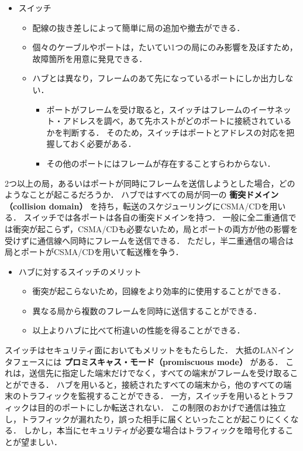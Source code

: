 \documentclass[a4paper]{ltjsarticle}
\providecommand{\tightlist}{%
  \setlength{\itemsep}{0pt}\setlength{\parskip}{0pt}}
\begin{document}
\begin{itemize}
\tightlist
\item
  スイッチ

  \begin{itemize}
  \tightlist
  \item
    配線の抜き差しによって簡単に局の追加や撤去ができる．
  \item
    個々のケーブルやポートは，たいてい1つの局にのみ影響を及ぼすため，故障箇所を用意に発見できる．
  \item
    ハブとは異なり，フレームのあて先になっているポートにしか出力しない．

    \begin{itemize}
    \tightlist
    \item
      ポートがフレームを受け取ると，スイッチはフレームのイーサネット・アドレスを調べ，あて先ホストがどのポートに接続されているかを判断する．
      そのため，スイッチはポートとアドレスの対応を把握しておく必要がある．
    \item
      その他のポートにはフレームが存在することすらわからない．
    \end{itemize}
  \end{itemize}
\end{itemize}

2つ以上の局，あるいはポートが同時にフレームを送信しようとした場合，どのようなことが起こるだろうか．
ハブではすべての局が同一の \textbf{衝突ドメイン（collision domain）}
を持ち，転送のスケジューリングにCSMA/CDを用いる．
スイッチでは各ポートは各自の衝突ドメインを持つ．
一般に全二重通信では衝突が起こらず，CSMA/CDも必要ないため，局とポートの両方が他の影響を受けずに通信線へ同時にフレームを送信できる．
ただし，半二重通信の場合は局とポートがCSMA/CDを用いて転送権を争う．

\begin{itemize}
\tightlist
\item
  ハブに対するスイッチのメリット

  \begin{itemize}
  \tightlist
  \item
    衝突が起こらないため，回線をより効率的に使用することができる．
  \item
    異なる局から複数のフレームを同時に送信することができる．
  \item
    以上よりハブに比べて桁違いの性能を得ることができる．
  \end{itemize}
\end{itemize}

スイッチはセキュリティ面においてもメリットをもたらした．
大抵のLANインタフェースには \textbf{プロミスキャス・モード（promiscuous
mode）} がある．
これは，送信先に指定した端末だけでなく，すべての端末がフレームを受け取ることができる．
ハブを用いると，接続されたすべての端末から，他のすべての端末のトラフィックを監視することができる．
一方，スイッチを用いるとトラフィックは目的のポートにしか転送されない．
この制限のおかげで通信は独立し，トラフィックが漏れたり，誤った相手に届くといったことが起こりにくくなる．
しかし，本当にセキュリティが必要な場合はトラフィックを暗号化することが望ましい．
\end{document}
